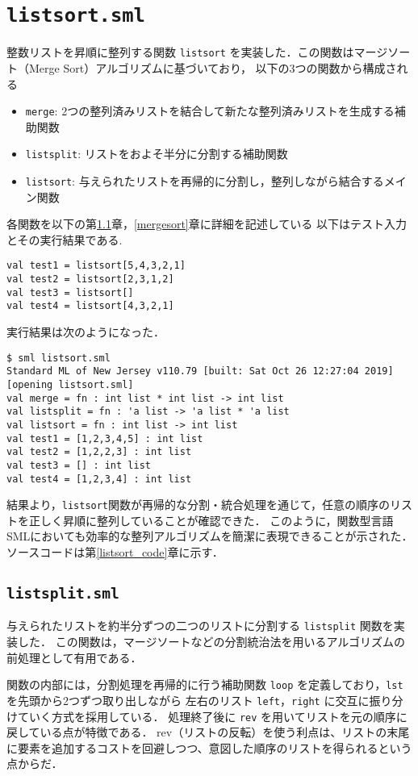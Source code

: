 \documentclass[autodetect-engine,dvi=dvipdfmx,ja=standard,
               a4j,11pt]{bxjsarticle}
\begin{document}
\section{\texttt{listsort.sml}}
整数リストを昇順に整列する関数 \verb|listsort| を実装した．この関数はマージソート（Merge Sort）アルゴリズムに基づいており，
以下の3つの関数から構成される
\begin{itemize}
  \item \texttt{merge}: 2つの整列済みリストを結合して新たな整列済みリストを生成する補助関数
  \item \texttt{listsplit}: リストをおよそ半分に分割する補助関数
  \item \texttt{listsort}: 与えられたリストを再帰的に分割し，整列しながら結合するメイン関数
\end{itemize}
各関数を以下の第\ref{listsplit}章，\ref{mergesort}章に詳細を記述している
以下はテスト入力とその実行結果である.
\begin{Verbatim}
val test1 = listsort[5,4,3,2,1]
val test2 = listsort[2,3,1,2]
val test3 = listsort[]
val test4 = listsort[4,3,2,1]
\end{Verbatim}
実行結果は次のようになった．
\begin{Verbatim}
$ sml listsort.sml 
Standard ML of New Jersey v110.79 [built: Sat Oct 26 12:27:04 2019]
[opening listsort.sml]
val merge = fn : int list * int list -> int list
val listsplit = fn : 'a list -> 'a list * 'a list
val listsort = fn : int list -> int list
val test1 = [1,2,3,4,5] : int list
val test2 = [1,2,2,3] : int list
val test3 = [] : int list
val test4 = [1,2,3,4] : int list  
\end{Verbatim}
結果より，\texttt{listsort}関数が再帰的な分割・統合処理を通じて，任意の順序のリストを正しく昇順に整列していることが確認できた．
このように，関数型言語SMLにおいても効率的な整列アルゴリズムを簡潔に表現できることが示された．
ソースコードは第\ref{listsort_code}章に示す．
\subsection{\texttt{listsplit.sml}}\label{listsplit}
与えられたリストを約半分ずつの二つのリストに分割する \verb|listsplit| 関数を実装した．
この関数は，マージソートなどの分割統治法を用いるアルゴリズムの前処理として有用である．

関数の内部には，分割処理を再帰的に行う補助関数 \verb|loop| を定義しており，\verb|lst| を先頭から2つずつ取り出しながら
左右のリスト \verb|left|，\verb|right| に交互に振り分けていく方式を採用している．
処理終了後に \verb|rev| を用いてリストを元の順序に戻している点が特徴である．
rev（リストの反転）を使う利点は、リストの末尾に要素を追加するコストを回避しつつ、意図した順序のリストを得られるという点からだ．
\end{document}
